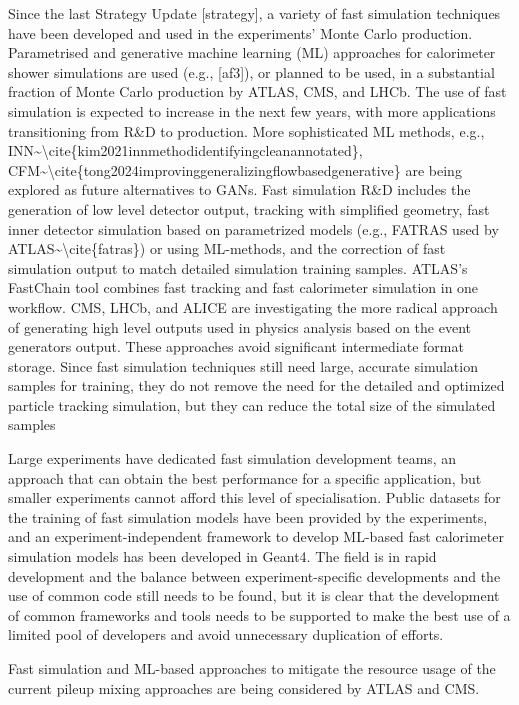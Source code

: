 Since the last Strategy Update {[}strategy{]}, a variety of fast
simulation techniques have been developed and used in the experiments'
Monte Carlo production. Parametrised and generative machine learning
(ML) approaches for calorimeter shower simulations are used (e.g.,
{[}af3{]}), or planned to be used, in a substantial fraction of Monte
Carlo production by ATLAS, CMS, and LHCb. The use of fast simulation is
expected to increase in the next few years, with more applications
transitioning from R\&D to production. More sophisticated ML methods,
e.g.,
INN\textasciitilde\textbackslash cite\{kim2021innmethodidentifyingcleanannotated\},
CFM\textasciitilde\textbackslash cite\{tong2024improvinggeneralizingflowbasedgenerative\}
are being explored as future alternatives to GANs. Fast simulation R\&D
includes the generation of low level detector output, tracking with
simplified geometry, fast inner detector simulation based on
parametrized models (e.g., FATRAS used by
ATLAS\textasciitilde\textbackslash cite\{fatras\}) or using ML-methods,
and the correction of fast simulation output to match detailed
simulation training samples. ATLAS's FastChain tool combines fast
tracking and fast calorimeter simulation in one workflow. CMS, LHCb, and
ALICE are investigating the more radical approach of generating high
level outputs used in physics analysis based on the event
generator\textquotesingle s output. These approaches avoid significant
intermediate format storage. Since fast simulation techniques still need
large, accurate simulation samples for training, they do not remove the
need for the detailed and optimized particle tracking simulation, but
they can reduce the total size of the simulated samples

Large experiments have dedicated fast simulation development teams, an
approach that can obtain the best performance for a specific
application, but smaller experiments cannot afford this level of
specialisation. Public datasets for the training of fast simulation
models have been provided by the experiments, and an
experiment-independent framework to develop ML-based fast calorimeter
simulation models has been developed in Geant4. The field is in rapid
development and the balance between experiment-specific developments and
the use of common code still needs to be found, but it is clear that the
development of common frameworks and tools needs to be supported to make
the best use of a limited pool of developers and avoid unnecessary
duplication of efforts.

Fast simulation and ML-based approaches to mitigate the resource usage
of the current pileup mixing approaches are being considered by ATLAS
and CMS.

